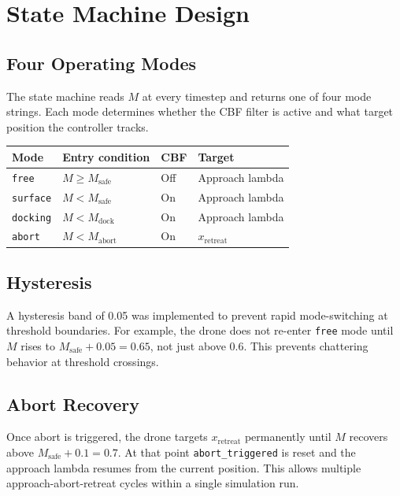\documentclass[12pt]{article}
\begin{document}
\section{State Machine Design}

\subsection{Four Operating Modes}

The state machine reads $M$ at every timestep and returns one of four
mode strings. Each mode determines whether the CBF filter is active
and what target position the controller tracks.

\begin{center}
\begin{tabular}{llll}
\toprule
\textbf{Mode} & \textbf{Entry condition} & \textbf{CBF} &
\textbf{Target} \\
\midrule
\texttt{free}    & $M \geq M_\mathrm{safe}$   & Off &
    Approach lambda \\
\texttt{surface} & $M < M_\mathrm{safe}$      & On  &
    Approach lambda \\
\texttt{docking} & $M < M_\mathrm{dock}$      & On  &
    Approach lambda \\
\texttt{abort}   & $M < M_\mathrm{abort}$     & On  &
    $x_\mathrm{retreat}$ \\
\bottomrule
\end{tabular}
\end{center}

\subsection{Hysteresis}

A hysteresis band of 0.05 was implemented to prevent rapid
mode-switching at threshold boundaries. For example, the drone does
not re-enter \texttt{free} mode until $M$ rises to
$M_\mathrm{safe} + 0.05 = 0.65$, not just above 0.6. This prevents
chattering behavior at threshold crossings.

\subsection{Abort Recovery}

Once abort is triggered, the drone targets $x_\mathrm{retreat}$
permanently until $M$ recovers above $M_\mathrm{safe} + 0.1 = 0.7$.
At that point \texttt{abort\_triggered} is reset and the approach
lambda resumes from the current position. This allows multiple
approach-abort-retreat cycles within a single simulation run.
\end{document}
